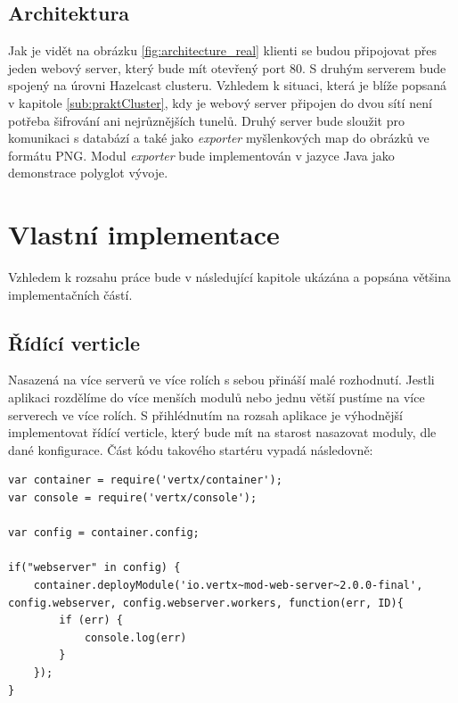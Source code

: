 
\subsection{Architektura}

Jak je vidět na obrázku \ref{fig:architecture_real} klienti se budou připojovat přes jeden webový server, který bude mít otevřený port 80. S druhým serverem bude spojený na úrovni Hazelcast clusteru. Vzhledem k situaci, která je blíže popsaná v kapitole \ref{sub:praktCluster}, kdy je webový server připojen do dvou sítí není potřeba šifrování ani nejrůznějších tunelů. Druhý server bude sloužit pro komunikaci s databází a také jako \emph{exporter} myšlenkových map do obrázků ve formátu PNG. Modul \emph{exporter} bude implementován v jazyce Java jako demonstrace polyglot vývoje.


\section{Vlastní implementace}

Vzhledem k rozsahu práce bude v následující kapitole ukázána a popsána většina implementačních částí.

\subsection{Řídící verticle}

Nasazená na více serverů ve více rolích s sebou přináší malé rozhodnutí. Jestli aplikaci rozdělíme do více menších modulů nebo jednu větší pustíme na více serverech ve více rolích. S přihlédnutím na rozsah aplikace je výhodnější implementovat řídící verticle, který bude mít na starost nasazovat moduly, dle dané konfigurace. Část kódu takového startéru vypadá následovně:

\begin{lstlisting}
var container = require('vertx/container');
var console = require('vertx/console');

var config = container.config;

if("webserver" in config) {
	container.deployModule('io.vertx~mod-web-server~2.0.0-final', config.webserver, config.webserver.workers, function(err, ID){
		if (err) {
			console.log(err)
		}
	});
}
\end{lstlisting}

